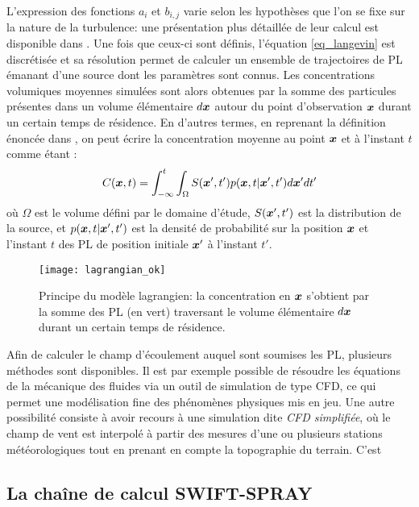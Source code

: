 L'expression des fonctions $a_i$ et $b_{i,j}$ varie selon les hypothèses que l'on se fixe sur la nature de la turbulence: une présentation plus détaillée de leur calcul est disponible dans \cite{Wilson1996}. Une fois que ceux-ci sont définis, l'équation \eqref{eq_langevin} est discrétisée et sa résolution permet de calculer un ensemble de trajectoires de PL émanant d'une source dont les paramètres sont connus. Les concentrations volumiques moyennes simulées sont alors obtenues par la somme des particules présentes dans un volume élémentaire $d{\bm{x}}$ autour du point d'observation ${\bm{x}}$ durant un certain temps de résidence. En d'autres termes, en reprenant la définition énoncée dans \cite{Flesch1995}, on peut écrire la concentration moyenne au point ${\bm{x}}$ et à l'instant $t$ comme étant : 
\begin{equation}
	C({\bm{x}}, t) = \int _{-\infty}^{t} \int_{\Omega} S({\bm{x}}',t')p({\bm{x}}, t | {\bm{x}}', t')d{\bm{x}}'dt'
	\label{eq_c_moyen_lagrangien}
\end{equation}
où $\Omega$ est le volume défini par le domaine d'étude, $S({\bm{x}}',t')$ est la distribution de la source, et $p({\bm{x}}, t | {\bm{x}}', t')$ est la densité de probabilité sur la position ${\bm{x}}$ et l'instant $t$ des PL de position initiale ${\bm{x}}'$ à l'instant $t'$. \\

\begin{figure}
	\centering
	\texttt{[image: lagrangian\_ok]}
	\caption{Principe du modèle lagrangien: la concentration en ${\bm{x}}$ s'obtient par la somme des PL (en vert) traversant le volume élémentaire $d{\bm{x}}$ durant un certain temps de résidence.}
	\label{fig_schema_lagrangien}
\end{figure}

Afin de calculer le champ d'écoulement \NdFS{$\Vecu$} auquel sont soumises les PL, plusieurs méthodes sont disponibles. Il est par exemple possible de résoudre les équations de la mécanique des fluides via un outil de simulation de type CFD, ce qui permet une modélisation fine des phénomènes physiques mis en jeu. Une autre possibilité consiste à avoir recours à une simulation dite \textit{CFD simplifiée}, où le champ de vent est interpolé à partir des mesures d'une ou plusieurs stations météorologiques tout en prenant en compte la topographie du terrain. C'est 

\subsection{La chaîne de calcul SWIFT-SPRAY}

